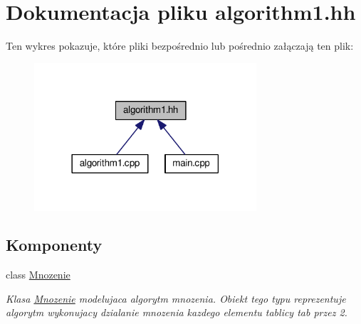 \hypertarget{algorithm1_8hh}{\section{Dokumentacja pliku algorithm1.\-hh}
\label{algorithm1_8hh}
}
Ten wykres pokazuje, które pliki bezpośrednio lub pośrednio załączają ten plik\-:\nopagebreak
\begin{figure}[H]
\begin{center}
\leavevmode
\includegraphics[width=234pt]{algorithm1_8hh__dep__incl}
\end{center}
\end{figure}
\subsection*{Komponenty}
\begin{DoxyCompactItemize}
\item 
class \hyperlink{class_mnozenie}{Mnozenie}
\begin{DoxyCompactList}\small\item\em Klasa \hyperlink{class_mnozenie}{Mnozenie} modelujaca algorytm mnozenia. Obiekt tego typu reprezentuje algorytm wykonujacy dzialanie mnozenia kazdego elementu tablicy tab przez 2. \end{DoxyCompactList}\end{DoxyCompactItemize}
